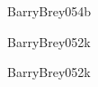 \begin{syllabus}
\begin{unit}{\ARMultiprocessingandalternativearchitectures}{}{BarryBrey05}{4}{b}
    \ARMultiprocessingandalternativearchitecturesAllTopics
    \ARMultiprocessingandalternativearchitecturesAllLearningOutcomes
\end{unit}

\begin{unit}{\ARPerformanceenhancements}{}{BarryBrey05}{2}{k}
    \ARPerformanceenhancementsAllTopics
    \ARPerformanceenhancementsAllLearningOutcomes
\end{unit}

\begin{unit}{\OSDeviceManagement}{}{BarryBrey05}{2}{k}
    \OSDeviceManagementAllTopics
    \OSDeviceManagementAllLearningOutcomes
\end{unit}

\begin{coursebibliography}
\end{coursebibliography}

\end{syllabus}

